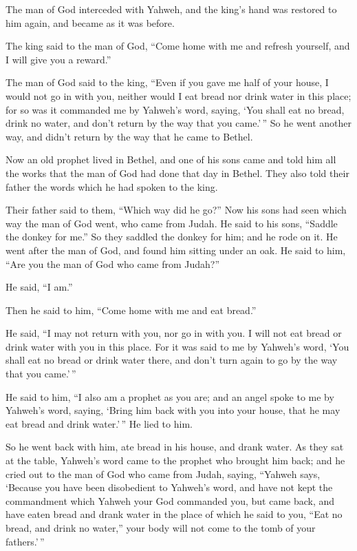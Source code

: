 The man of God interceded with Yahweh, and the king's hand was restored
to him again, and became as it was before.

 The king said to the man of God, ``Come home with me and
refresh yourself, and I will give you a reward.''

 The man of God said to the king, ``Even if you gave me
half of your house, I would not go in with you, neither would I eat
bread nor drink water in this place;  for so was it
commanded me by Yahweh's word, saying, `You shall eat no bread, drink no
water, and don't return by the way that you came.'\,'' 
So he went another way, and didn't return by the way that he came to
Bethel.

 Now an old prophet lived in Bethel, and one of his sons
came and told him all the works that the man of God had done that day in
Bethel. They also told their father the words which he had spoken to the
king.

 Their father said to them, ``Which way did he go?'' Now
his sons had seen which way the man of God went, who came from Judah.
 He said to his sons, ``Saddle the donkey for me.'' So
they saddled the donkey for him; and he rode on it.  He
went after the man of God, and found him sitting under an oak. He said
to him, ``Are you the man of God who came from Judah?''

He said, ``I am.''

 Then he said to him, ``Come home with me and eat
bread.''

 He said, ``I may not return with you, nor go in with
you. I will not eat bread or drink water with you in this place.
 For it was said to me by Yahweh's word, `You shall eat
no bread or drink water there, and don't turn again to go by the way
that you came.'\,''

 He said to him, ``I also am a prophet as you are; and an
angel spoke to me by Yahweh's word, saying, `Bring him back with you
into your house, that he may eat bread and drink water.'\,'' He lied to
him.

 So he went back with him, ate bread in his house, and
drank water.  As they sat at the table, Yahweh's word
came to the prophet who brought him back;  and he cried
out to the man of God who came from Judah, saying, ``Yahweh says,
`Because you have been disobedient to Yahweh's word, and have not kept
the commandment which Yahweh your God commanded you,  but
came back, and have eaten bread and drank water in the place of which he
said to you, ``Eat no bread, and drink no water,'' your body will not
come to the tomb of your fathers.'\,''

